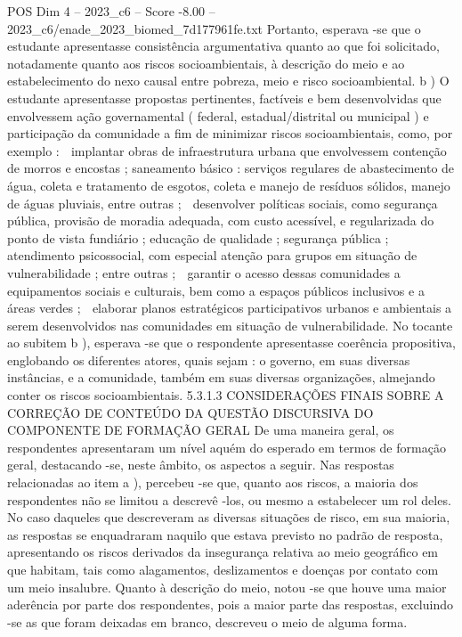 \begin{textsample}{POS Dim 4 – 2023\_c6 – Score -8.00 – 2023\_c6/enade\_2023\_biomed\_7d177961fe.txt}
Portanto, esperava -se que o estudante apresentasse consistência argumentativa quanto ao que foi solicitado, notadamente quanto aos riscos socioambientais, à descrição do meio e ao estabelecimento do nexo causal entre pobreza, meio e risco socioambiental. b ) O estudante apresentasse propostas pertinentes, factíveis e bem desenvolvidas que envolvessem ação governamental ( federal, estadual/distrital ou municipal ) e participação da comunidade a fim de minimizar riscos socioambientais, como, por exemplo :  implantar obras de infraestrutura urbana que envolvessem contenção de morros e encostas ; saneamento básico : serviços regulares de abastecimento de água, coleta e tratamento de esgotos, coleta e manejo de resíduos sólidos, manejo de águas pluviais, entre outras ;  desenvolver políticas sociais, como segurança pública, provisão de moradia adequada, com custo acessível, e regularizada do ponto de vista fundiário ; educação de qualidade ; segurança pública ; atendimento psicossocial, com especial atenção para grupos em situação de vulnerabilidade ; entre outras ;  garantir o acesso dessas comunidades a equipamentos sociais e culturais, bem como a espaços públicos inclusivos e a áreas verdes ;  elaborar planos estratégicos participativos urbanos e ambientais a serem desenvolvidos nas comunidades em situação de vulnerabilidade.
No tocante ao subitem b ), esperava -se que o respondente apresentasse coerência propositiva, englobando os diferentes atores, quais sejam : o governo, em suas diversas instâncias, e a comunidade, também em suas diversas organizações, almejando conter os riscos socioambientais. 5.3.1.3 CONSIDERAÇÕES FINAIS SOBRE A CORREÇÃO DE CONTEÚDO DA QUESTÃO DISCURSIVA DO COMPONENTE DE FORMAÇÃO GERAL De uma maneira geral, os respondentes apresentaram um nível aquém do esperado em termos de formação geral, destacando -se, neste âmbito, os aspectos a seguir.
Nas respostas relacionadas ao item a ), percebeu -se que, quanto aos riscos, a maioria dos respondentes não se limitou a descrevê -los, ou mesmo a estabelecer um rol deles.
No caso daqueles que descreveram as diversas situações de risco, em sua maioria, as respostas se enquadraram naquilo que estava previsto no padrão de resposta, apresentando os riscos derivados da insegurança relativa ao meio geográfico em que habitam, tais como alagamentos, deslizamentos e doenças por contato com um meio insalubre.
Quanto à descrição do meio, notou -se que houve uma maior aderência por parte dos respondentes, pois a maior parte das respostas, excluindo -se as que foram deixadas em branco, descreveu o meio de alguma forma.

\end{textsample}
